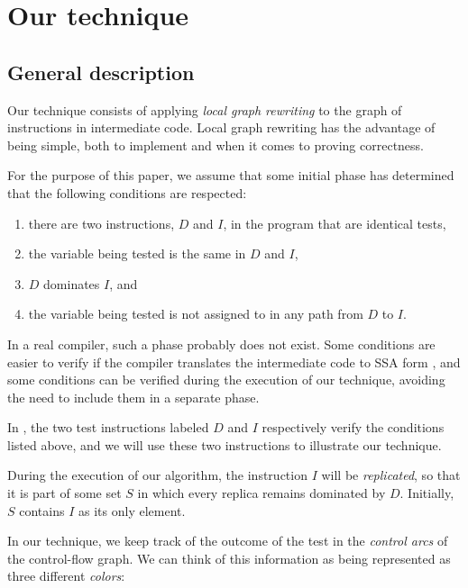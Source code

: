 \section{Our technique}

\subsection{General description}
\label{sec-our-technique-general-description}

Our technique consists of applying \emph{local graph rewriting} to the
graph of instructions in intermediate code.  Local graph rewriting has
the advantage of being simple, both to implement and when it comes to
proving correctness.

For the purpose of this paper, we assume that some initial phase has
determined that the following conditions are respected:

\begin{enumerate}
\item there are two instructions, $D$ and $I$, in the program that
  are identical tests,
\item the variable being tested is the same in $D$ and $I$,
\item $D$ dominates $I$, and
\item the variable being tested is not assigned to in any path from
  $D$ to $I$.
\end{enumerate}

In a real compiler, such a phase probably does not exist.  Some
conditions are easier to verify if the compiler translates the
intermediate code to SSA form \cite{Cytron:1989:EMC:75277.75280,
  Cytron:1991:ECS:115372.115320}, and some conditions can be verified
during the execution of our technique, avoiding the need to include
them in a separate phase.

In , the two test instructions labeled $D$
and $I$ respectively verify the conditions listed above, and we will
use these two instructions to illustrate our technique.

During the execution of our algorithm, the instruction $I$ will be
\emph{replicated}, so that it is part of some set $S$ in which every
replica remains dominated by $D$.  Initially, $S$ contains $I$ as its
only element.

In our technique, we keep track of the outcome of the test in the
\emph{control arcs} of the control-flow graph.  We can think of this
information as being represented as three different \emph{colors}:

